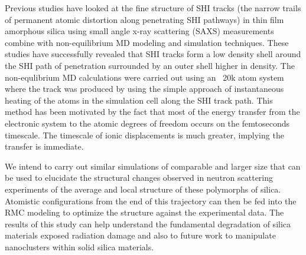 Previous studies have looked at the fine structure of SHI tracks (the narrow trails of permanent atomic distortion along penetrating SHI pathways) in thin film amorphous silica using small angle x-ray scattering (SAXS) measurements combine with non-equilibrium MD modeling and simulation techniques. These studies have successfully revealed that SHI tracks form a low density shell around the SHI path of penetration surrounded by an outer shell higher in density. The non-equlibrium MD calculations were carried out using an ~20k atom system where the track was produced by using the simple approach of instantaneous heating of  the atoms in the simulation cell along the SHI track path. This method has been motivated by the fact that most of the energy transfer from the electronic system to the atomic degrees of freedom occurs on the femtoseconds timescale.  The timescale of ionic displacements is much greater, implying the transfer is immediate. 

We intend to carry out similar simulations of comparable and larger size that can be used to elucidate the structural changes observed in neutron scattering experiments of the average and local structure of these polymorphs of silica. Atomistic configurations from the end of this trajectory can then be fed into the RMC modeling to optimize the structure against the experimental data. The results of this study can help understand the fundamental degradation of silica materials exposed radiation damage and also to future work to manipulate nanoclusters within solid silica materials. 

